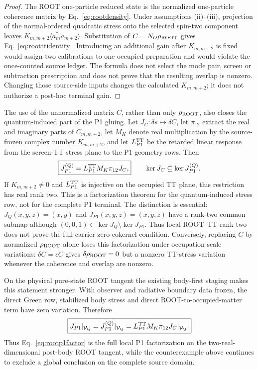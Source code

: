 \begin{proof}
The ROOT one-particle reduced state is the normalized one-particle coherence matrix by
Eq.~\eqref{eq:rootdensity}.  Under assumptions (ii)--(iii), projection of the
normal-ordered quadratic stress onto the selected spin-two component leaves
$K_{m,m+2}\langle a_m^\dagger a_{m+2}\rangle$.  Substitution of
$C=N_O\rho_{\rm ROOT}$ gives Eq.~\eqref{eq:rootttidentity}.  Introducing an
additional gain after $K_{m,m+2}$ is fixed would assign two calibrations to one
occupied preparation and would violate the once-counted source ledger.  The
formula does not select the mode pair, screen or subtraction prescription and
does not prove that the resulting overlap is nonzero.  Changing those
source-side inputs changes the calculated $K_{m,m+2}$; it does not authorize a
post-hoc terminal gain.
\end{proof}

The use of the unnormalized matrix $C$, rather than only
$\rho_{\rm ROOT}$, also closes the quantum-induced part of the P1 gluing.
Let $J_C:\delta s\mapsto\delta C$, let $\pi_{12}$ extract the real and
imaginary parts of $C_{m,m+2}$, let $M_K$ denote real multiplication by the
source-frozen complex number $K_{m,m+2}$, and let $L_{P1}^{\rm TT}$ be the
retarded linear response from the screen-TT stress plane to the P1 geometry
rows.  Then
\begin{equation}
\boxed{
J_{P1}^{(Q)}=L_{P1}^{\rm TT}M_K\pi_{12}J_C,}
\qquad
\ker J_C\subseteq\ker J_{P1}^{(Q)}.
\label{eq:rootp1factor}
\end{equation}
If $K_{m,m+2}\neq0$ and $L_{P1}^{\rm TT}$ is injective on the occupied TT
plane, this restriction has real rank two.  This is a factorization theorem
for the quantum-induced stress row, not for the complete P1 terminal.  The
distinction is essential: $J_Q(x,y,z)=(x,y)$ and
$J_{P1}(x,y,z)=(x,y,z)$ have a rank-two common submap although
$(0,0,1)\in\ker J_Q\setminus\ker J_{P1}$.  Thus local ROOT--TT rank two does
not prove the full-carrier zero-cokernel condition.  Conversely, replacing
$C$ by normalized $\rho_{\rm ROOT}$ alone loses this factorization under
occupation-scale variations: $\delta C=\epsilon C$ gives
$\delta\rho_{\rm ROOT}=0$ but a nonzero TT-stress variation whenever the
coherence and overlap are nonzero.

On the physical pure-state ROOT tangent the existing body-first staging makes
this statement stronger.  With observer and radiative boundary data frozen,
the direct Green row, stabilized body stress and direct
ROOT-to-occupied-matter term have zero variation.  Therefore
\begin{equation}
\boxed{
J_{P1}|_{\mathcal V_Q}
=J_{P1}^{(Q)}|_{\mathcal V_Q}
=L_{P1}^{\rm TT}M_K\pi_{12}J_C|_{\mathcal V_Q}.}
\label{eq:rootp1tangentfactor}
\end{equation}
Thus Eq.~\eqref{eq:rootp1factor} is the full local P1 factorization on the
two-real-dimensional post-body ROOT tangent, while the counterexample above
continues to exclude a global conclusion on the complete source domain.

